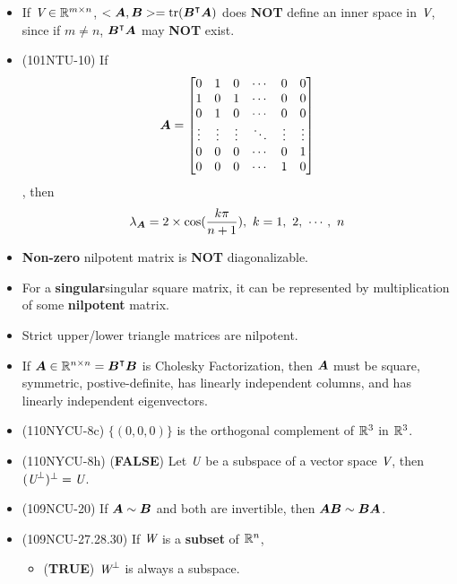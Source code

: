 \begin{itemize}
    \item If $\textit{V} \in \mathbb{R}^{m \times n}$, $<\boldsymbol{A}, \boldsymbol{B}> = \operatorname{tr}(\boldsymbol{B}^\intercal\boldsymbol{A})$ does \textbf{NOT} define an inner space in $\textit{V}$, since if $m \neq n$, $\boldsymbol{B}^\intercal\boldsymbol{A}$ may \textbf{NOT} exist.
    \item (101NTU-10) If \begin{equation}
        \boldsymbol{A} = 
        \begin{bmatrix} 
            0 & 1 & 0 & \cdots & 0 & 0 \\
            1 & 0 & 1 & \cdots & 0 & 0 \\
            0 & 1 & 0 & \cdots & 0 & 0 \\
            \vdots & \vdots & \vdots & \ddots & \vdots & \vdots \\
            0 & 0 & 0 & \cdots & 0 & 1 \\
            0 & 0 & 0 & \cdots & 1 & 0
        \end{bmatrix}
    \end{equation}, then \begin{equation}
        \lambda_{\boldsymbol{A}} = 2 \times \cos(\frac{k\pi}{n + 1}), \ k = 1,\ 2, \ \cdots, \ n
    \end{equation}
    \item \textbf{Non-zero} nilpotent matrix is \textbf{NOT} diagonalizable.
    \item For a \textbf{singular}{singular} square matrix, it can be represented by multiplication of some \textbf{nilpotent} matrix.
    \item Strict upper/lower triangle matrices are nilpotent.
    \item If $\boldsymbol{A} \in \mathbb{R}^{n \times n} = \boldsymbol{B}^\intercal\boldsymbol{B}$ is Cholesky Factorization, then $\boldsymbol{A}$ must be square, symmetric, postive-definite, has linearly independent columns, and has linearly independent eigenvectors. 
    \item (110NYCU-8c) $\{(0, 0, 0)\}$ is the orthogonal complement of $\mathbb{R}^3$ in $\mathbb{R}^3$.
    \item (110NYCU-8h) (\textbf{FALSE}) Let $\textit{U}$ be a subspace of a vector space $\textit{V}$, then $(\textit{U}^{\bot})^{\bot} = \textit{U}$.
    \item (109NCU-20) If $\boldsymbol{A} \sim \boldsymbol{B}$ and both are invertible, then $\boldsymbol{A}\boldsymbol{B} \sim \boldsymbol{B}\boldsymbol{A}$.
    \item (109NCU-27.28.30) If $\textit{W}$ is a \textbf{subset} of $\mathbb{R}^n$, \begin{itemize}
        \item (\textbf{TRUE}) $\textit{W}^{\bot}$ is always a subspace.

\end{itemize}
\end{itemize}
